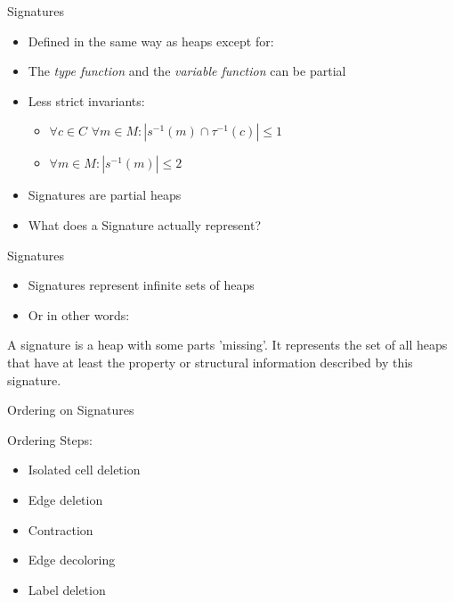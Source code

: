 \begin{frame}[fragile]{Signatures}
    
    \begin{itemize}
        \item <2-> Defined in the same way as heaps except for:
        \item <3-> The \textit{type function} and the \textit{variable function} can be partial
        \item <4-> Less strict invariants: \\
            \begin{itemize}
                \item <5-> $\forall c \in C$ $\forall m \in M : |s^{-1}(m) \cap \tau^{-1}(c)| \le 1$
                \item <6-> $\forall m \in M : |s^{-1}(m)| \le 2$
            \end{itemize}
        \item <7-> Signatures are partial heaps
        \item <8-> What does a Signature actually represent?
    \end{itemize}

\end{frame}

\begin{frame}[fragile]{Signatures}
    
    \pause

    \begin{itemize}
        \item <2-> Signatures represent infinite sets of heaps
        \item <3-> Or in other words:
    \end{itemize}

    \pause 

    \pause

    \medskip

     A signature is a heap with some parts 'missing'. It represents the set of all heaps that have at least the property or structural information described by this signature.
\end{frame}

\begin{frame}[fragile]{Ordering on Signatures}
    
    \pause

    Ordering Steps:

    \pause

    \begin{itemize}
        \item <3-> Isolated cell deletion
        \item <4-> Edge deletion
        \item <5-> Contraction
        \item <6-> Edge decoloring
        \item <7-> Label deletion
    \end{itemize}

\end{frame}

